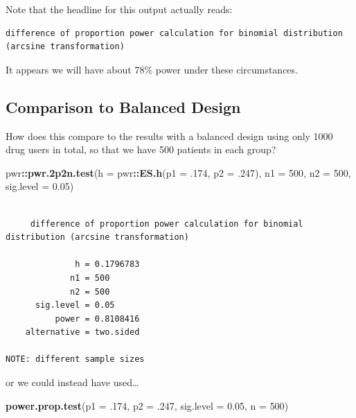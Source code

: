 \documentclass[
]{book}
\newenvironment{Shaded}{\begin{snugshade}}{\end{snugshade}}
\newcommand{\DataTypeTok}[1]{\textcolor[rgb]{0.13,0.29,0.53}{#1}}
\newcommand{\DecValTok}[1]{\textcolor[rgb]{0.00,0.00,0.81}{#1}}
\newcommand{\FloatTok}[1]{\textcolor[rgb]{0.00,0.00,0.81}{#1}}
\newcommand{\KeywordTok}[1]{\textcolor[rgb]{0.13,0.29,0.53}{\textbf{#1}}}
\newcommand{\NormalTok}[1]{#1}
\newcommand{\OperatorTok}[1]{\textcolor[rgb]{0.81,0.36,0.00}{\textbf{#1}}}
\begin{document}
Note that the headline for this output actually reads:

\begin{verbatim}
difference of proportion power calculation for binomial distribution 
(arcsine transformation) 
\end{verbatim}

It appears we will have about 78\% power under these circumstances.

\hypertarget{comparison-to-balanced-design}{%
\subsection{Comparison to Balanced Design}\label{comparison-to-balanced-design}}

How does this compare to the results with a balanced design using only 1000 drug users in total, so that we have 500 patients in each group?

\begin{Shaded}
\begin{Highlighting}[]
\NormalTok{pwr}\OperatorTok{::}\KeywordTok{pwr.2p2n.test}\NormalTok{(}\DataTypeTok{h =}\NormalTok{ pwr}\OperatorTok{::}\KeywordTok{ES.h}\NormalTok{(}\DataTypeTok{p1 =} \FloatTok{.174}\NormalTok{, }\DataTypeTok{p2 =} \FloatTok{.247}\NormalTok{), }
                   \DataTypeTok{n1 =} \DecValTok{500}\NormalTok{, }\DataTypeTok{n2 =} \DecValTok{500}\NormalTok{, }\DataTypeTok{sig.level =} \FloatTok{0.05}\NormalTok{)}
\end{Highlighting}
\end{Shaded}

\begin{verbatim}

     difference of proportion power calculation for binomial distribution (arcsine transformation) 

              h = 0.1796783
             n1 = 500
             n2 = 500
      sig.level = 0.05
          power = 0.8108416
    alternative = two.sided

NOTE: different sample sizes
\end{verbatim}

or we could instead have used\ldots{}

\begin{Shaded}
\begin{Highlighting}[]
\KeywordTok{power.prop.test}\NormalTok{(}\DataTypeTok{p1 =} \FloatTok{.174}\NormalTok{, }\DataTypeTok{p2 =} \FloatTok{.247}\NormalTok{, }
                \DataTypeTok{sig.level =} \FloatTok{0.05}\NormalTok{, }\DataTypeTok{n =} \DecValTok{500}\NormalTok{)}
\end{Highlighting}
\end{Shaded}
\end{document}
